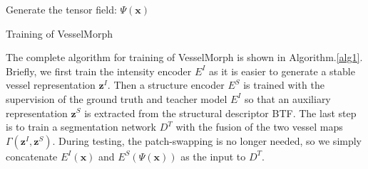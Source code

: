 \documentclass[runningheads]{llncs}
\begin{document}
\begin{algorithm}[H]
\label{alg1}
  \DontPrintSemicolon
  
   \textcolor{gray}{}
   \nl{} 
  \nl Generate the tensor field: $\Psi(\mathbf{x})$ \;
  \textcolor{gray}{}
  \nl{} 
  
  \textcolor{gray}{}
  \nl{}
  \caption{Training of VesselMorph}
\end{algorithm}

The complete algorithm for training of VesselMorph is shown in Algorithm.\ref{alg1}. Briefly, we first train the intensity encoder $E^I$ as it is easier to generate a stable vessel representation $\mathbf{z}^I$. Then a structure encoder $E^S$ is trained with the supervision of the ground truth and teacher model $E^I$ so that an auxiliary representation $\mathbf{z}^S$ is extracted from the structural descriptor BTF. The last step is to train a segmentation network $D^{T}$ with the fusion of the two vessel maps $\Gamma(\mathbf{z}^I,\mathbf{z}^S)$. During testing, the patch-swapping is no longer needed, so we simply concatenate $E^I(\mathbf{x})$ and $E^S(\Psi(\mathbf{x}))$ as the input to $D^T$.
\end{document}
